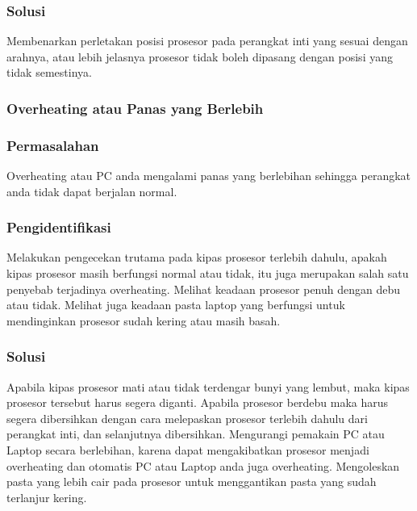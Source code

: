 	\subsubsection{Solusi}
Membenarkan perletakan posisi prosesor pada perangkat inti yang sesuai dengan arahnya, atau lebih jelasnya prosesor tidak boleh
dipasang dengan posisi yang tidak semestinya.

\subsubsection{Overheating atau Panas yang Berlebih}
	\subsubsection{Permasalahan}
Overheating atau PC anda mengalami panas yang berlebihan sehingga perangkat anda tidak dapat berjalan normal.
	\subsubsection{Pengidentifikasi}
Melakukan pengecekan trutama pada kipas prosesor terlebih dahulu, apakah kipas prosesor masih berfungsi normal atau tidak, itu
juga merupakan salah satu penyebab terjadinya overheating. Melihat keadaan prosesor penuh dengan debu atau tidak. Melihat juga
keadaan pasta laptop yang berfungsi untuk mendinginkan prosesor sudah kering atau masih basah.
	\subsubsection{Solusi}
Apabila kipas prosesor mati atau tidak terdengar bunyi yang lembut, maka kipas prosesor tersebut harus segera diganti. Apabila
prosesor berdebu maka harus segera dibersihkan dengan cara melepaskan prosesor terlebih dahulu dari perangkat inti, dan
selanjutnya dibersihkan. Mengurangi pemakain PC atau Laptop secara berlebihan, karena dapat mengakibatkan prosesor menjadi
overheating dan otomatis PC atau Laptop anda juga overheating. Mengoleskan pasta yang lebih cair pada prosesor untuk 
menggantikan pasta yang sudah terlanjur kering.
